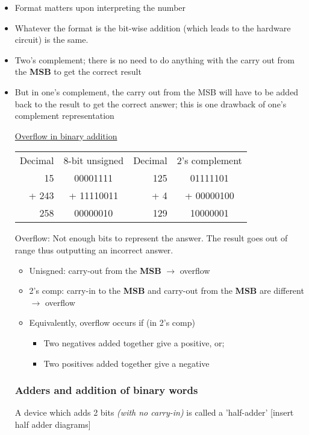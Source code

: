\documentclass{article}
\begin{document}
\begin{itemize}
\item Format matters upon interpreting the number
\item Whatever the format is the bit-wise addition (which leads to the hardware circuit) is the same.
\item Two's complement; there is no need to do anything with the carry out from the \textbf{MSB} to get the correct result
\item But in one's complement, the carry out from the MSB will have to be added back to the result to get the correct answer;
this is one drawback of one's complement representation

\underline{Overflow in binary addition}

\begin{tabular} { r | c | r | c }
Decimal & 8-bit unsigned & Decimal & 2's complement \\
15 & 00001111 & 125 & 01111101 \\
+ 243 & + 11110011 & + 4 & + 00000100 \\
\hline
258 & 00000010 & 129 & 10000001 \\
\end{tabular}

Overflow: Not enough bits to represent the answer. The result goes out of range thus outputting an incorrect answer.

\begin{itemize}
\item Unisgned: carry-out from the \textbf{MSB} $\rightarrow$ overflow
\item 2's comp: carry-in to the \textbf{MSB} and carry-out from the \textbf{MSB} are different $\rightarrow$ overflow
\item Equivalently, overflow occurs if (in 2's comp)
\begin{itemize}
\item Two negatives added together give a positive, or;
\item Two positives added together give a negative
\end{itemize}
\end{itemize}

\subsubsection{Adders and addition of binary words}

A device which adds 2 bits \textit{(with no carry-in)} is called a 'half-adder'
[insert half adder diagrams]


\end{itemize}
\end{document}
